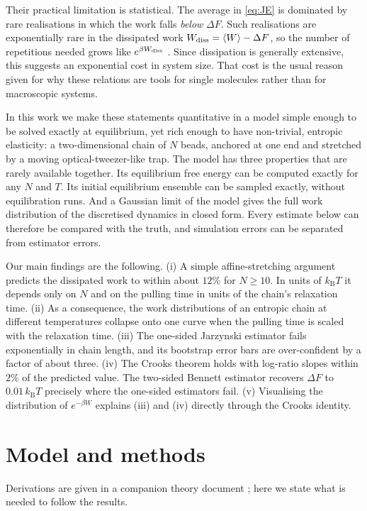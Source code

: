 \documentclass[11pt,a4paper]{article}
\newcommand{\kT}{k_{\mathrm B}T}
\newcommand{\avg}[1]{\left\langle #1\right\rangle}
\newcommand{\Wd}{W_{\rm diss}}
\begin{document}
Their practical limitation is statistical. The average in \eqref{eq:JE} is dominated by rare
realisations in which the work falls \emph{below} $\Delta F$. Such realisations are exponentially rare
in the dissipated work $\Wd=\avg W-\Delta F$, so the number of repetitions needed grows like
$e^{\beta\Wd}$ \cite{J06,G03}. Since dissipation is generally extensive, this suggests an exponential cost
in system size. That cost is the usual reason given for why these relations are tools for single molecules rather than for macroscopic
systems.

In this work we make these statements quantitative in a model simple enough to be solved exactly at
equilibrium, yet rich enough to have non-trivial, entropic elasticity: a two-dimensional chain of $N$
beads, anchored at one end and stretched by a moving optical-tweezer-like trap. The model has three
properties that are rarely available together. Its equilibrium free energy can be computed exactly for
any $N$ and $T$. Its initial equilibrium ensemble can be sampled exactly, without equilibration runs.
And a Gaussian limit of the model gives the full work distribution of the discretised dynamics in
closed form. Every estimate below can therefore be compared with the truth, and simulation errors can
be separated from estimator errors.

Our main findings are the following. (i) A simple affine-stretching argument predicts the dissipated work
to within about $12\%$ for $N\ge10$. In units of $\kT$ it depends only on $N$ and on the pulling time
in units of the chain's relaxation time. (ii) As a consequence, the work distributions of an entropic
chain at different temperatures collapse onto one curve when the pulling time is scaled with the relaxation time.
(iii) The one-sided Jarzynski estimator fails exponentially in chain length, and its bootstrap error bars
are over-confident by a factor of about three. (iv) The Crooks theorem holds with log-ratio slopes within
$2\%$ of the predicted value. The two-sided Bennett estimator recovers $\Delta F$ to $0.01\,\kT$ precisely where the one-sided estimators fail. (v) Visualising the
distribution of $e^{-\beta W}$ explains (iii) and (iv) directly through the Crooks identity.

\section{Model and methods}

Derivations are given in a companion theory document \cite{theory}; here we state what is needed to
follow the results.
\end{document}
